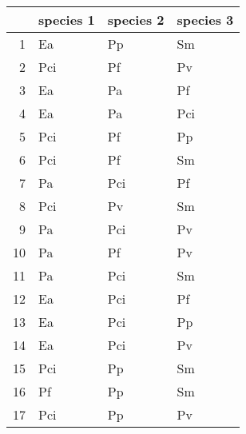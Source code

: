 \begin{table}[ht]
\centering
\begin{tabular}{rlll}
  \hline
 & species 1 & species 2 & species 3 \\ 
  \hline
1 & Ea & Pp & Sm \\ 
  2 & Pci & Pf & Pv \\ 
  3 & Ea & Pa & Pf \\ 
  4 & Ea & Pa & Pci \\ 
  5 & Pci & Pf & Pp \\ 
  6 & Pci & Pf & Sm \\ 
  7 & Pa & Pci & Pf \\ 
  8 & Pci & Pv & Sm \\ 
  9 & Pa & Pci & Pv \\ 
  10 & Pa & Pf & Pv \\ 
  11 & Pa & Pci & Sm \\ 
  12 & Ea & Pci & Pf \\ 
  13 & Ea & Pci & Pp \\ 
  14 & Ea & Pci & Pv \\ 
  15 & Pci & Pp & Sm \\ 
  16 & Pf & Pp & Sm \\ 
  17 & Pci & Pp & Pv \\ 
   \hline
\end{tabular}
\end{table}
